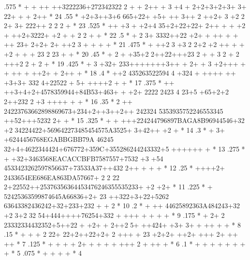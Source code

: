 \begin{Listing}
      .575  *              + +  ++ ++3222236+272342322 2  +       + 2++  + 3 +4 + 2+2+3+2+3+ 3+ 22+  +  +  2++         *  24
      .55   *                    +2+3++3+6  665+22+ +5+  ++  3++ 2 ++2+ 3   +2 2 2+ 3+  222++ 2 2    2      +          *  23
      .525  *               ++ +3 + +2+4  35+2+22+22+ 2++ +          +  +2  +   ++2+3222+   +2 + + 2  2  +     +       *  22
      .5    *                       + 2 3+ 3332++22  +2+ + ++ +  +   ++    23+  2+2+ 2+ ++2 3 + +              +   +   *  21
      .475  *                    +  ++2 3 +3  2   2+2 +2 ++  +     +    +2 +    +  +   23   2       23 +       +       *  20
      .45   *                  + 2 + +35+2 2++22+++23     2          +    +  3 2  + 2 +++2 2  +  2    +                *  19
      .425  *                   +   3 +32+  233+++++++3++  + 2+    + 3 +2+++ + +   ++ + ++2+ +  2++  +                 *  18
      .4    *                    ++2  435263522594 4 +324  + ++++   ++   +3+3+  332 4+22522 + 5+ ++++2    +       +    *  17
      .375  *             ++  ++3+4+2+4578359944+84B53+463+ + +2+ 2222 2423 4 23+5 +65+2+2 2++232 2 +3  ++++   + +     *  16
      .35   *             2  ++  24223763662898869673+234+2++3++2++ 242324 5353935752246553345 ++52+++5232  2+   +     *  15
      .325  *            + + +++224244796897BAGA8B96944546+32  +2   34224422+569642273485454575A3525+  3+42++ +2 +     *  14
      .3    *              + 3+ +6244456768EGABBGBB79A 46245 32+4+4622344424+676772+359C+355286244243332+5 ++++++ +    *  13
      .275  *            +    +32+3463568EACACCBFB7587557+7532  +3 +54 4533423262597856637+73533A37++432 2++ + + +     *  12
      .25   *             ++++2+ 2433654EE686EA863DA57667+  2 2 22 2+22552++25376356364453476246355535233+  +2 +2+     *  11
      .225  *                 +  52425363599874645A66836+2+ 23 ++322+3+22+5262 63643382436242+32+233+232    + +  2     *  10
      .2    *                   + ++ 44625892363A484243+32 +2           3+2 32 54+444++++76254+332 +   +++ + + +  +    *   9
      .175  *               +     2+  2 23332334432352+5++22  +      +2+ +   2++2 5+ ++424+ +3+  3+  +  ++  + +        *   8
      .15   *            +        +  + 2 22+ 22+2++22+2+ 2      +++   +        23 +2+2+ ++2+    +++ 2+      ++ ++      *   7
      .125  *                 +   + +     + 2+  + +  +                     + +++   2      +   ++              +        *   6
      .1    *                                         + +             +       +    +                + +            +   *   5
      .075  *                    +    +     +                                      +                                   *   4

\end{Listing}
